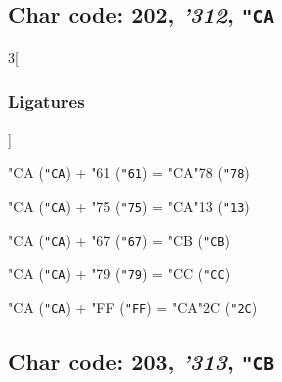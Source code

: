 \documentclass{article}
\newlength{\maxcharwidth}
\begin{document}
\subsection{Char code: 202, {\it'312}, {\tt"CA}}
\label{char_202}


\begin{multicols}{3}[\subsubsection{Ligatures}]

{\testfont\char"CA\noboundary} ({\tt"CA}) + {\testfont\char"61\noboundary} ({\tt"61}) = {\testfont\char"CA\noboundary}{\testfont\char"78\noboundary} ({\tt"78}) 

{\testfont\char"CA\noboundary} ({\tt"CA}) + {\testfont\char"75\noboundary} ({\tt"75}) = {\testfont\char"CA\noboundary}{\testfont\char"13\noboundary} ({\tt"13}) 

{\testfont\char"CA\noboundary} ({\tt"CA}) + {\testfont\char"67\noboundary} ({\tt"67}) = {\testfont\char"CB\noboundary} ({\tt"CB}) 

{\testfont\char"CA\noboundary} ({\tt"CA}) + {\testfont\char"79\noboundary} ({\tt"79}) = {\testfont\char"CC\noboundary} ({\tt"CC}) 

{\testfont\char"CA\noboundary} ({\tt"CA}) + {\testfont\char"FF\noboundary} ({\tt"FF}) = {\testfont\char"CA\noboundary}{\testfont\char"2C\noboundary} ({\tt"2C}) 

\end{multicols}

\subsection{Char code: 203, {\it'313}, {\tt"CB}}
\label{char_203}

\end{document}
